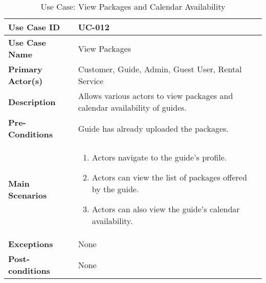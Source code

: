 \begin{table}[ht]
    \centering
    \begin{tabular}{|l|p{}|}
        \hline
        \textbf{Use Case ID} & UC-012 \\
        \hline
        \textbf{Use Case Name} & View Packages \\
        \hline
        \textbf{Primary Actor(s)} & Customer, Guide, Admin, Guest User, Rental Service \\
        \hline
        \textbf{Description} & Allows various actors to view packages and calendar availability of guides. \\
        \hline
        \textbf{Pre-Conditions} & Guide has already uploaded the packages. \\
        \hline
        \textbf{Main Scenarios} & 
        \begin{enumerate}[label=\arabic*.,itemsep=0pt]
            \item Actors navigate to the guide's profile.
            \item Actors can view the list of packages offered by the guide.
            \item Actors can also view the guide's calendar availability.
        \end{enumerate} \\
        \hline
        \textbf{Exceptions} & None \\
        \hline
        \textbf{Post-conditions} & None \\
        \hline
    \end{tabular}
    \label{tab:use-case-view-packages}
    \caption{Use Case: View Packages and Calendar Availability}
\end{table}


